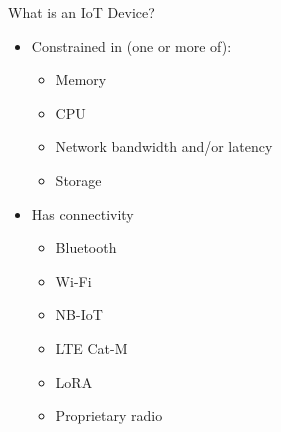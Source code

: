 \begin{frame}{What is an IoT Device?}
\protect\hypertarget{what-is-an-iot-device-1}{}

\begin{itemize}
\tightlist
\item
  Constrained in (one or more of):

  \begin{itemize}
  \tightlist
  \item
    Memory
  \item
    CPU
  \item
    Network bandwidth and/or latency
  \item
    Storage
  \end{itemize}
\item
  Has connectivity

  \begin{itemize}
  \tightlist
  \item
    Bluetooth
  \item
    Wi-Fi
  \item
    NB-IoT
  \item
    LTE Cat-M
  \item
    LoRA
  \item
    Proprietary radio
  \end{itemize}
\end{itemize}


\end{frame}

